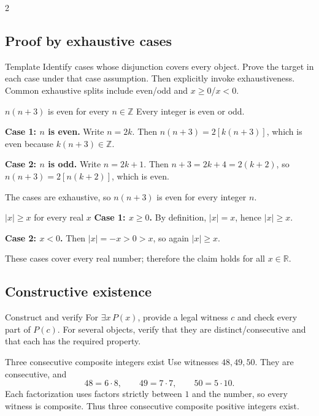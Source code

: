 \documentclass[10pt]{article}
\newcommand{\Z}{\mathbb Z}
\newcommand{\R}{\mathbb R}
\begin{document}
\begin{multicols}{2}
\raggedcolumns
\subsection*{Proof by exhaustive cases}

\begin{methodbox}{Template}
Identify cases whose disjunction covers every object. Prove the target in each
case under that case assumption. Then explicitly invoke exhaustiveness.
Common exhaustive splits include even/odd and $x\ge0$/$x<0$.
\end{methodbox}

\begin{workedbox}{$n(n+3)$ is even for every $n\in\Z$}
Every integer is even or odd.

\textbf{Case 1: $n$ is even.} Write $n=2k$. Then
$n(n+3)=2[k(n+3)]$, which is even because $k(n+3)\in\Z$.

\textbf{Case 2: $n$ is odd.} Write $n=2k+1$. Then
$n+3=2k+4=2(k+2)$, so $n(n+3)=2[n(k+2)]$, which is even.

The cases are exhaustive, so $n(n+3)$ is even for every integer $n$.
\end{workedbox}

\begin{workedbox}{$|x|\ge x$ for every real $x$}
\textbf{Case 1: $x\ge0$.} By definition, $|x|=x$, hence $|x|\ge x$.

\textbf{Case 2: $x<0$.} Then $|x|=-x>0>x$, so again $|x|\ge x$.

These cases cover every real number; therefore the claim holds for all
$x\in\R$.
\end{workedbox}

\columnbreak
\subsection*{Constructive existence}

\begin{methodbox}{Construct and verify}
For $\exists x\,P(x)$, provide a legal witness $c$ and check every part of
$P(c)$. For several objects, verify that they are distinct/consecutive and that
each has the required property.
\end{methodbox}

\begin{workedbox}{Three consecutive composite integers exist}
Use witnesses $48,49,50$. They are consecutive, and
\[
48=6\cdot8,\qquad49=7\cdot7,\qquad50=5\cdot10.
\]
Each factorization uses factors strictly between $1$ and the number, so every
witness is composite. Thus three consecutive composite positive integers exist.
\end{workedbox}


\end{multicols}
\end{document}
